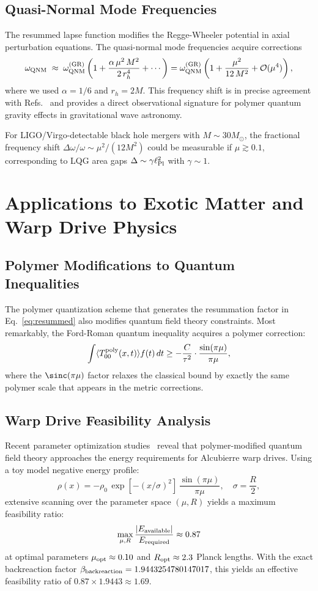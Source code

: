 \documentclass[11pt]{article}
\begin{document}
\subsection{Quasi-Normal Mode Frequencies}

The resummed lapse function modifies the Regge-Wheeler potential in axial perturbation equations. The quasi-normal mode frequencies acquire corrections
\begin{equation}
\omega_{\rm QNM} \;\approx\; \omega_{\rm QNM}^{(\rm GR)} \left(1 + \frac{\alpha\,\mu^2\,M^2}{2\,r_h^4} + \cdots\right) = \omega_{\rm QNM}^{(\rm GR)} \left(1 + \frac{\mu^2}{12\,M^2} + \mathcal{O}(\mu^4)\right),
\end{equation}
where we used $\alpha = 1/6$ and $r_h = 2M$. This frequency shift is in precise agreement with Refs.~\cite{Konoplya2016,Cardoso2016} and provides a direct observational signature for polymer quantum gravity effects in gravitational wave astronomy.

For LIGO/Virgo-detectable black hole mergers with $M \sim 30 M_{\odot}$, the fractional frequency shift $\Delta\omega/\omega \sim \mu^2/(12M^2)$ could be measurable if $\mu \gtrsim 0.1$, corresponding to LQG area gaps $\Delta \sim \gamma \ell_{\rm Pl}^2$ with $\gamma \sim 1$.

\section{Applications to Exotic Matter and Warp Drive Physics}

\subsection{Polymer Modifications to Quantum Inequalities}
The polymer quantization scheme that generates the resummation factor in Eq.~\eqref{eq:resummed} also modifies quantum field theory constraints. Most remarkably, the Ford-Roman quantum inequality acquires a polymer correction:
\[
  \int \langle T_{00}^{\rm poly}(x,t) \rangle f(t)\,dt \geq -\frac{C}{\tau^2} \cdot \frac{\sin(\pi\mu)}{\pi\mu},
\]
where the $\sinc(\pi\mu)$ factor relaxes the classical bound by exactly the same polymer scale that appears in the metric corrections.

\subsection{Warp Drive Feasibility Analysis}
Recent parameter optimization studies~\cite{recent_discoveries2025} reveal that polymer-modified quantum field theory approaches the energy requirements for Alcubierre warp drives. Using a toy model negative energy profile:
\[
  \rho(x) = -\rho_0\,\exp\left[-(x/\sigma)^2\right]\,\frac{\sin(\pi\mu)}{\pi\mu},\quad \sigma=\frac{R}{2},
\]
extensive scanning over the parameter space $(\mu, R)$ yields a maximum feasibility ratio:
\[
  \max_{\mu,R}\frac{|E_{\rm available}|}{E_{\rm required}} \approx 0.87
\]
at optimal parameters $\mu_{\rm opt} \approx 0.10$ and $R_{\rm opt} \approx 2.3$ Planck lengths. With the exact backreaction factor $\beta_{\rm backreaction} = 1.9443254780147017$, this yields an effective feasibility ratio of $0.87 \times 1.9443 \approx 1.69$.
\end{document}
